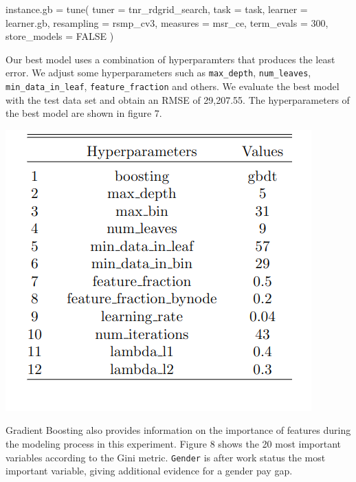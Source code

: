 \documentclass[11pt,a4paper]{article}
\let\origfigure\figure
\let\endorigfigure\endfigure
\renewenvironment{figure}[1][2] {
    \expandafter\origfigure\expandafter[H]
} {
    \endorigfigure
}
\newenvironment{Shaded}{\begin{snugshade}}{\end{snugshade}}
\newcommand{\AttributeTok}[1]{\textcolor[rgb]{0.77,0.63,0.00}{#1}}
\newcommand{\ConstantTok}[1]{\textcolor[rgb]{0.00,0.00,0.00}{#1}}
\newcommand{\DecValTok}[1]{\textcolor[rgb]{0.00,0.00,0.81}{#1}}
\newcommand{\FunctionTok}[1]{\textcolor[rgb]{0.00,0.00,0.00}{#1}}
\newcommand{\NormalTok}[1]{#1}
\newcommand{\OtherTok}[1]{\textcolor[rgb]{0.56,0.35,0.01}{#1}}
\begin{document}
\begin{Shaded}
\begin{Highlighting}[]
\NormalTok{instance.gb }\OtherTok{=} \FunctionTok{tune}\NormalTok{(}
  \AttributeTok{tuner =}\NormalTok{ tnr\_rdgrid\_search,}
  \AttributeTok{task =}\NormalTok{ task,}
  \AttributeTok{learner =}\NormalTok{ learner.gb,}
  \AttributeTok{resampling =}\NormalTok{ rsmp\_cv3,}
  \AttributeTok{measures =}\NormalTok{ msr\_ce,}
  \AttributeTok{term\_evals =} \DecValTok{300}\NormalTok{,}
  \AttributeTok{store\_models =} \ConstantTok{FALSE}
\NormalTok{)}
\end{Highlighting}
\end{Shaded}

Our best model uses a combination of hyperparamters that produces the
least error. We adjust some hyperparameters such as \texttt{max\_depth},
\texttt{num\_leaves}, \texttt{min\_data\_in\_leaf},
\texttt{feature\_fraction} and others. We evaluate the best model with
the test data set and obtain an RMSE of 29,207.55. The hyperparameters
of the best model are shown in figure 7.

\begin{figure}
\includegraphics[width=0.5\linewidth]{includes/GB_hyper} \caption{Best Hyperparameters for Gradient Boosting}\label{fig:unnamed-chunk-2}
\end{figure}

Gradient Boosting also provides information on the importance of
features during the modeling process in this experiment. Figure 8 shows
the 20 most important variables according to the Gini metric.
\texttt{Gender} is after work status the most important variable, giving
additional evidence for a gender pay gap.
\end{document}
